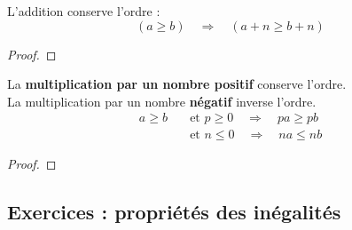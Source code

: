 \documentclass[main.tex]{subfiles}
\begin{document}
\begin{theorem}[Addition] 
	L'addition conserve l'ordre :
	\[
	(a\geqslant b )\quad \Rightarrow \quad (a+n\geqslant b+n)
	\] 
\end{theorem}
\begin{proof}\hfill  
\end{proof}
\vfill
\begin{theorem}[Multiplication]  
	La \textbf{multiplication par un nombre positif} conserve l'ordre.\\
	La multiplication par un nombre \textbf{négatif} inverse l'ordre.
	\begin{align*}
		a\geqslant b \quad &\text{et } p\geqslant 0 \quad \Rightarrow \quad  pa \geqslant pb \\
		&  \text{et } n\leqslant 0 \quad \Rightarrow \quad na \leqslant nb 
	\end{align*}
\end{theorem}
\begin{proof}\hfill  
\end{proof}
\vfill


\newpage 
{}  
\pagestyle{scrheadings} %
\onehalfspacing
\subsection{Exercices : propriétés des inégalités}
\end{document}
